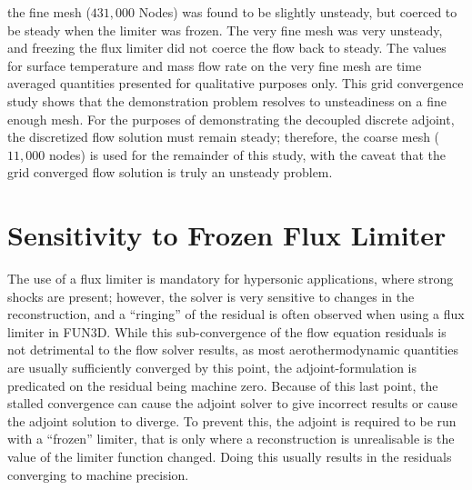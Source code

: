 the fine mesh ($431,000$ Nodes) was found to be slightly unsteady, but coerced
to be steady when the limiter was frozen.  The very fine mesh was very unsteady,
and freezing the flux limiter did not coerce the flow back to steady.  The
values for surface temperature and mass flow rate on the very fine mesh are time
averaged quantities presented for qualitative purposes only.  This grid
convergence study shows that the demonstration problem resolves to unsteadiness
on a fine enough mesh.  For the purposes of demonstrating the decoupled
discrete adjoint, the discretized flow solution must remain steady; therefore,
the coarse mesh ($11,000$ nodes) is used for the remainder of this study, with
the caveat that the grid converged flow solution is truly an unsteady problem.

\section{Sensitivity to Frozen Flux Limiter}
\label{sec:frozen-limiter}

The use of a flux limiter is mandatory for hypersonic applications,
where strong shocks are present; however, the solver is very sensitive to
changes in the reconstruction, and a ``ringing'' of the residual is often
observed\cite{gnoffo2007ringing} when using a flux limiter in FUN3D. While this
sub-convergence of the flow equation residuals is not detrimental to the flow
solver results, as most aerothermodynamic quantities are usually sufficiently
converged by this point, the adjoint-formulation is predicated on the residual
being machine zero.  Because of this last point, the stalled convergence can
cause the adjoint solver to give incorrect results or cause the adjoint solution
to diverge.  To prevent this, the adjoint is required to be run with a
``frozen'' limiter, that is only where a reconstruction is unrealisable is the
value of the limiter function changed.  Doing this usually results in the
residuals converging to machine precision.

